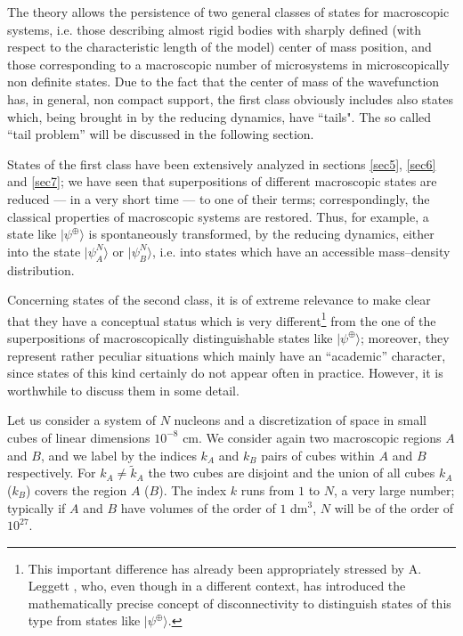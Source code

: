 \documentclass[12pt]{article}
\begin{document}
The theory allows the persistence of two general classes of states
for macroscopic systems, i.e. those describing almost rigid bodies
with sharply defined (with respect to the characteristic  length
of the model) center of mass position, and those corresponding to
a macroscopic number of microsystems in microscopically non
definite states. Due to the fact that the center of mass of the
wavefunction has, in general, non compact support, the first class
obviously includes also states which, being brought in by the
reducing dynamics, have ``tails". The so called ``tail problem''
will be  discussed in the following section.

States of the first class have been extensively analyzed in
sections \ref{sec5}, \ref{sec6} and \ref{sec7};  we have seen
that superpositions of different macroscopic states are reduced
--- in a very short time --- to one of their terms;
correspondingly, the classical properties of
macroscopic systems are restored. Thus, for example, a state like
$|\psi^{\oplus}\rangle$ is spontaneously transformed, by the
reducing dynamics, either into the state $|\psi^{N}_{A}\rangle$ or
$|\psi^{N}_{B}\rangle$, i.e. into states which have an accessible
mass--density distribution.

Concerning states of the second class, it is of extreme relevance
to make  clear that they have a conceptual status which is very
different\footnote{This important difference has already been
appropriately stressed by A. Leggett \cite{legg80}, who, even
though in a different context, has introduced the mathematically
precise concept of disconnectivity to distinguish states of this
type from states like $|\psi^{\oplus}\rangle$.} from the one of
the superpositions of macroscopically distinguishable states like
$|\psi^{\oplus}\rangle$; moreover, they represent rather peculiar
situations which mainly have an ``academic'' character, since
states of this kind certainly do not appear often in practice.
However, it is worthwhile to discuss them in some detail.

Let us consider a system of $N$ nucleons and a discretization of
space in small cubes of linear dimensions $10^{-8}$ cm. We
consider again two macroscopic regions $A$ and $B$, and we label by the
indices $k_{A}$  and $k_{B}$  pairs of cubes within $A$ and $B$
respectively. For $k_{A} \neq \tilde k_{A}$  the two cubes are
disjoint and the union of all cubes $k_{A}$  ($k_{B}$) covers the
region $A$ ($B$). The index $k$ runs from $1$ to $N$, a very large
number; typically if $A$ and $B$ have volumes of the order of $1$
dm$^{3}$, $N$ will be of the order of $10^{27}$.
\end{document}
